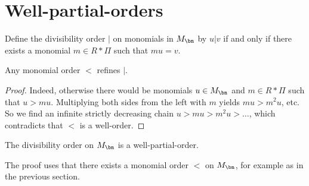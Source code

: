 \documentclass{amsart}
\begin{document}
\section*{Well-partial-orders}

Define the divisibility order $|$ on monomials in $M_\bn$ by $u|v$
if and only if there exists a monomial $m \in R*\Pi$ such that $mu = v$.

\begin{lm}
Any monomial order $<$ refines $|$. 
\end{lm}

\begin{proof}
Indeed, otherwise there would be monomials $u \in M_\bn$ and $m \in
R*\Pi$ such that $u>mu$. Multiplying both sides from the left with $m$
yields $mu>m^2u$, etc. So we find an infinite strictly decreasing chain
$u>mu>m^2u>\ldots$, which contradicts that $<$ is a well-order.
\end{proof}

\begin{prop}
The divisibility order on $M_\bn$ is a well-partial-order.
\end{prop}

The proof uses that there exists a monomial order $<$ on $M_\bn$, for example
as in the previous section.
\end{document}
